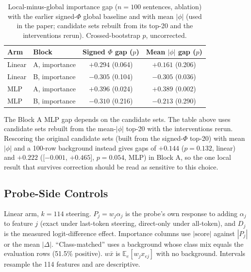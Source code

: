 \begin{table}[H]
\centering
\small
\setlength{\tabcolsep}{4pt}
\caption{Local-minus-global importance gap ($n=100$ sentences, ablation) with the earlier signed-$\Phi$ global baseline and with mean $|\phi|$ (used in the paper; candidate sets rebuilt from its top-20 and the interventions rerun). Crossed-bootstrap $p$, uncorrected.}
\label{tab:local-meanabs}
\begin{tabular}{llcc}
\toprule
Arm & Block & Signed $\Phi$ gap ($p$) & Mean $|\phi|$ gap ($p$) \\
\midrule
Linear & A, importance & $+0.294$ (0.064) & $+0.161$ (0.206) \\
Linear & B, importance & $-0.305$ (0.104) & $-0.305$ (0.036) \\
MLP    & A, importance & $+0.396$ (0.024) & $+0.389$ (0.002) \\
MLP    & B, importance & $-0.310$ (0.216) & $-0.213$ (0.290) \\
\bottomrule
\end{tabular}
\end{table}

The Block A MLP gap depends on the candidate sets. The table above uses candidate sets rebuilt from the mean-$|\phi|$ top-20 with the interventions rerun. Rescoring the original candidate sets (built from the signed-$\Phi$ top-20) with mean $|\phi|$ and a 100-row background instead gives gaps of $+0.144$ ($p=0.132$, linear) and $+0.222$ ([$-0.001$, $+0.465$], $p=0.054$, MLP) in Block A, so the one local result that survives correction should be read as sensitive to this choice.

\subsection{Probe-Side Controls}
\label{app:probe-controls}

Linear arm, $k=114$ steering. $P_j=w_j\alpha_j$ is the probe's own response to adding $\alpha_j$ to feature $j$ (exact under last-token steering, direct-only under all-token), and $D_j$ is the measured logit-difference effect. Importance columns use $|\text{score}|$ against $|P_j|$ or the mean $|\Delta|$. ``Class-matched'' uses a background whose class mix equals the evaluation rows (51.5\% positive). $w\bar{x}$ is $\mathbb{E}_e[w_jx_{ej}]$ with no background. Intervals resample the 114 features and are descriptive.

